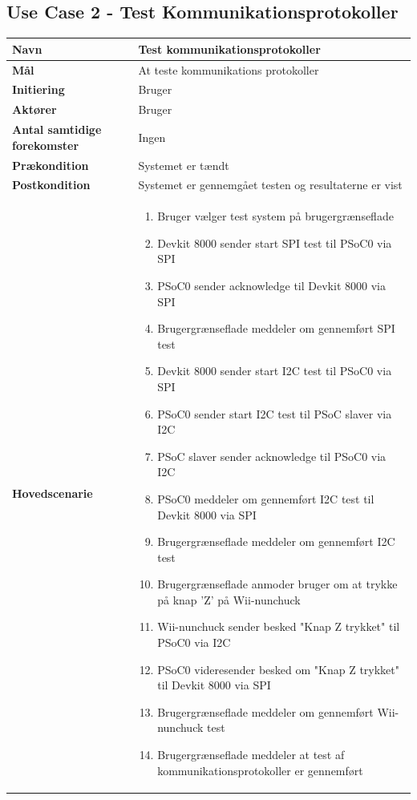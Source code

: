 \subsection{Use Case 2 - Test Kommunikationsprotokoller}
\label{afsnit:FUC2}
\begin{longtable}{|>{\hspace{0pt}}p{3cm}  |>{\hspace{0pt}}p{9cm}|}
	\hline
	\textbf{Navn} & Test kommunikationsprotokoller\\ \hline
	\textbf{Mål} & At teste kommunikations protokoller \\ \hline
	\textbf{Initiering} & Bruger\\ \hline
	\textbf{Aktører} & Bruger\\ \hline
	\textbf{Antal samtidige forekomster} & Ingen \\ \hline
	\textbf{Prækondition} & Systemet er tændt \\ \hline
	\textbf{Postkondition} &  Systemet er gennemgået testen og resultaterne er vist \\ \hline
	\textbf{Hovedscenarie} & \begin{enumerate}
		\item Bruger vælger test system på brugergrænseflade
		\item Devkit 8000 sender start SPI test til PSoC0 via SPI
		\item PSoC0 sender acknowledge til Devkit 8000 via SPI
		\subitem[Exception 1: PSoC0 sender ikke acknowledge]
		\item Brugergrænseflade meddeler om gennemført SPI test
		\item Devkit 8000 sender start I2C test til PSoC0 via SPI
		\item PSoC0 sender start I2C test til PSoC slaver via I2C
		\item PSoC slaver sender acknowledge til PSoC0 via I2C
		\subitem[Exception 2: PSoC slaver sender ikke acknowledge]
		\item PSoC0 meddeler om gennemført I2C test til Devkit 8000 via SPI
		\item Brugergrænseflade meddeler om gennemført I2C test
		\item Brugergrænseflade anmoder bruger om at trykke på knap 'Z' på Wii-nunchuck
		\item Wii-nunchuck sender besked "Knap Z trykket" til PSoC0 via I2C
		\subitem[Exception 3: Wii-nunchuck sender ikke "Knap Z trykket"]
		\item PSoC0 videresender besked om "Knap Z trykket" til Devkit 8000 via SPI
		\item Brugergrænseflade meddeler om gennemført Wii-nunchuck test
		\item Brugergrænseflade meddeler at test af kommunikationsprotokoller er gennemført 
		

\end{enumerate}
\end{longtable}
